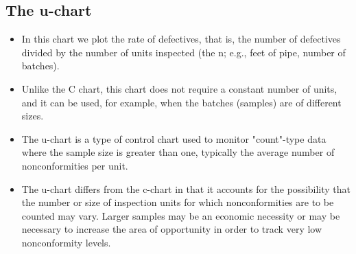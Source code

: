 \documentclass[SPC-MASTER.tex]{subfiles}
\begin{document}
\subsection{The u-chart}
\begin{itemize}
\item In this chart we plot the rate of defectives, that is, the number of defectives divided by the number of units inspected (the n; e.g., feet of pipe, number of batches). 
\item Unlike the C chart, this chart does not require a constant number of units, and it can be used, for example, when the batches (samples) are of different sizes.

\item The u-chart is a type of control chart used to monitor "count"-type data where the sample size is greater than one, typically the average number of nonconformities per unit.

\item The u-chart differs from the c-chart in that it accounts for the possibility that the number or size of inspection units for which nonconformities are to be counted may vary. Larger samples may be an economic necessity or may be necessary to increase the area of opportunity in order to track very low nonconformity levels.
\end{itemize}
\end{document}
